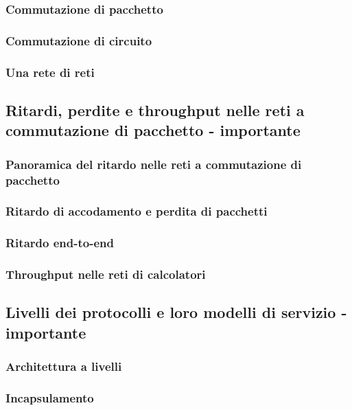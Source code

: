 \subsubsection{Commutazione di pacchetto}
\subsubsection{Commutazione di circuito}
\subsubsection{Una rete di reti}

\subsection{Ritardi, perdite e throughput nelle reti a commutazione di pacchetto - importante}
\subsubsection{Panoramica del ritardo nelle reti a commutazione di pacchetto}
\subsubsection{Ritardo di accodamento e perdita di pacchetti}
\subsubsection{Ritardo end-to-end} 
\subsubsection{Throughput nelle reti di calcolatori} 

\subsection{Livelli dei protocolli e loro modelli di servizio - importante} 
\subsubsection{Architettura a livelli }
\subsubsection{Incapsulamento}

